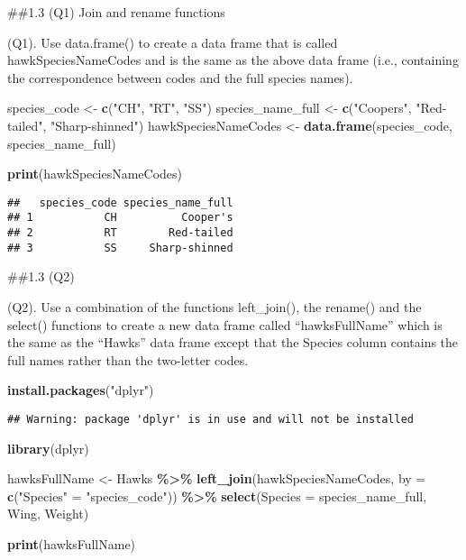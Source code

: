 \documentclass[
]{article}
\newenvironment{Shaded}{\begin{snugshade}}{\end{snugshade}}
\newcommand{\AttributeTok}[1]{\textcolor[rgb]{0.13,0.29,0.53}{#1}}
\newcommand{\FunctionTok}[1]{\textcolor[rgb]{0.13,0.29,0.53}{\textbf{#1}}}
\newcommand{\NormalTok}[1]{#1}
\newcommand{\OtherTok}[1]{\textcolor[rgb]{0.56,0.35,0.01}{#1}}
\newcommand{\SpecialCharTok}[1]{\textcolor[rgb]{0.81,0.36,0.00}{\textbf{#1}}}
\newcommand{\StringTok}[1]{\textcolor[rgb]{0.31,0.60,0.02}{#1}}
\begin{document}
\#\#1.3 (Q1) Join and rename functions

(Q1). Use data.frame() to create a data frame that is called
hawkSpeciesNameCodes and is the same as the above data frame (i.e.,
containing the correspondence between codes and the full species names).

\begin{Shaded}
\begin{Highlighting}[]
\NormalTok{species\_code }\OtherTok{\textless{}{-}} \FunctionTok{c}\NormalTok{(}\StringTok{"CH"}\NormalTok{, }\StringTok{"RT"}\NormalTok{, }\StringTok{"SS"}\NormalTok{)}
\NormalTok{species\_name\_full }\OtherTok{\textless{}{-}} \FunctionTok{c}\NormalTok{(}\StringTok{"Cooper\textquotesingle{}s"}\NormalTok{, }\StringTok{"Red{-}tailed"}\NormalTok{, }\StringTok{"Sharp{-}shinned"}\NormalTok{)}
\NormalTok{hawkSpeciesNameCodes }\OtherTok{\textless{}{-}} \FunctionTok{data.frame}\NormalTok{(species\_code, species\_name\_full)}

\FunctionTok{print}\NormalTok{(hawkSpeciesNameCodes)}
\end{Highlighting}
\end{Shaded}

\begin{verbatim}
##   species_code species_name_full
## 1           CH          Cooper's
## 2           RT        Red-tailed
## 3           SS     Sharp-shinned
\end{verbatim}

\#\#1.3 (Q2)

(Q2). Use a combination of the functions left\_join(), the rename() and
the select() functions to create a new data frame called
``hawksFullName'' which is the same as the ``Hawks'' data frame except
that the Species column contains the full names rather than the
two-letter codes.

\begin{Shaded}
\begin{Highlighting}[]
\FunctionTok{install.packages}\NormalTok{(}\StringTok{"dplyr"}\NormalTok{)}
\end{Highlighting}
\end{Shaded}

\begin{verbatim}
## Warning: package 'dplyr' is in use and will not be installed
\end{verbatim}

\begin{Shaded}
\begin{Highlighting}[]
\FunctionTok{library}\NormalTok{(dplyr)}


\NormalTok{hawksFullName }\OtherTok{\textless{}{-}}\NormalTok{ Hawks }\SpecialCharTok{\%\textgreater{}\%}
  \FunctionTok{left\_join}\NormalTok{(hawkSpeciesNameCodes, }\AttributeTok{by =} \FunctionTok{c}\NormalTok{(}\StringTok{"Species"} \OtherTok{=} \StringTok{"species\_code"}\NormalTok{)) }\SpecialCharTok{\%\textgreater{}\%}
  \FunctionTok{select}\NormalTok{(}\AttributeTok{Species =}\NormalTok{ species\_name\_full, Wing, Weight)  }

\FunctionTok{print}\NormalTok{(hawksFullName)}
\end{Highlighting}
\end{Shaded}
\end{document}
